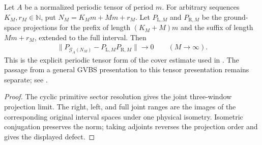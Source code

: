 \begin{lemma}
    \label{thm:periodic_physical_cover_projection_decay}
    \leanok

    Let $A$ be a normalized periodic tensor of period $m$. For arbitrary
    sequences $K_M,r_M\in\mathbb N$, put $N_M=K_Mm+Mm+r_M$.
    Let $P_{\mathrm L,M}$ and $P_{\mathrm R,M}$ be the ground-space
    projections for the prefix of length $(K_M+M)m$ and the suffix of length
    $Mm+r_M$, extended to the full interval. Then
    \begin{align}
        \|P_{\mathcal G_A(N_M)}-P_{\mathrm L,M}P_{\mathrm R,M}\|
        \longrightarrow 0 \qquad (M\longrightarrow\infty).
    \end{align}
    This is the explicit periodic tensor form of the cover estimate used in
    \cite[Lemma commutation (ii) and Section 6]{Nachtergaele1996Spectral}.
    The passage from a general GVBS presentation to this tensor presentation
    remains separate; see \cite{gap:nachtergaele96_infinite_volume_ground_projection}.
\end{lemma}
\begin{proof}\leanok
    The cyclic primitive sector resolution gives the joint three-window
    projection limit. The right, left, and full joint ranges are the images
    of the corresponding original interval spaces under one physical isometry.
    Isometric conjugation preserves the norm; taking adjoints reverses the
    projection order and gives the displayed defect.
\end{proof}

